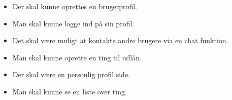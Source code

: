 
\begin{itemize}
  \item Der skal kunne oprettes en brugerprofil. 
  \item Man skal kunne logge ind på sin profil.
  \item Det skal være muligt at kontakte andre brugere via en chat funktion.
  \item Man skal kunne oprette en ting til udlån.
  \item Der skal være en personlig profil side.
  \item Man skal kunne se en liste over ting.
\end{itemize}